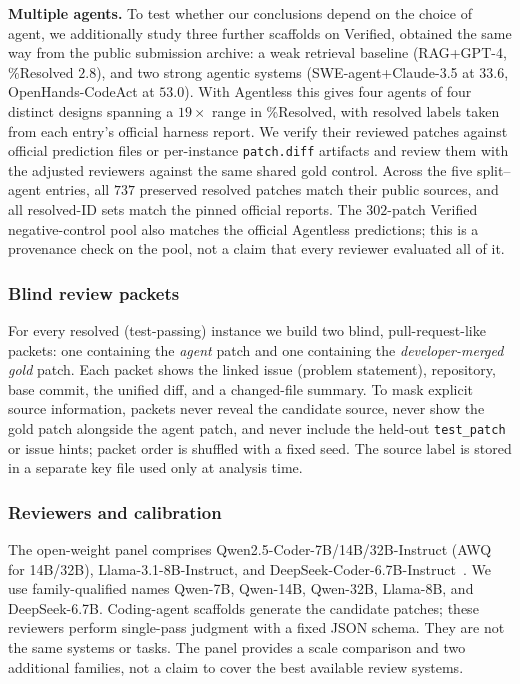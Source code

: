 \documentclass[10pt,conference]{IEEEtran}
\begin{document}
\textbf{Multiple agents.} To test whether our conclusions depend on the choice of agent, we
additionally study three further scaffolds on Verified, obtained the same way from the public
submission archive: a weak retrieval baseline (RAG+GPT-4, \%Resolved $2.8$), and two strong
agentic systems (SWE-agent+Claude-3.5 at $33.6$, OpenHands-CodeAct at $53.0$). With Agentless
this gives four agents of four distinct designs spanning a $19\times$ range in \%Resolved, with
resolved labels taken from each entry's official harness report. We verify their reviewed
patches against official prediction files or per-instance \texttt{patch.diff} artifacts and
review them with the adjusted reviewers against the same shared gold control. Across the
five split--agent entries, all $737$ preserved resolved patches match their public sources,
and all resolved-ID sets match the pinned official reports. The $302$-patch Verified
negative-control pool also matches the official Agentless predictions; this is a provenance
check on the pool, not a claim that every reviewer evaluated all of it.

\subsubsection{Blind review packets}
For every resolved (test-passing) instance we build two blind, pull-request-like packets: one
containing the \emph{agent} patch and one containing the \emph{developer-merged gold} patch.
Each packet shows the linked issue (problem statement), repository, base commit, the unified
diff, and a changed-file summary. To mask explicit source information, packets never reveal the
candidate source, never show the gold patch alongside the agent patch, and never include the
held-out \texttt{test\_patch} or issue hints; packet order is shuffled with a fixed seed. The
source label is stored in a separate key file used only at analysis time.

\subsubsection{Reviewers and calibration}

The open-weight panel comprises Qwen2.5-Coder-7B/14B/32B-Instruct (AWQ for 14B/32B),
Llama-3.1-8B-Instruct, and DeepSeek-Coder-6.7B-Instruct~\cite{qwen25coder}. We use
family-qualified names Qwen-7B, Qwen-14B, Qwen-32B, Llama-8B, and DeepSeek-6.7B.
Coding-agent scaffolds generate the candidate patches; these reviewers perform single-pass
judgment with a fixed JSON schema. They are not the same systems or tasks. The panel
provides a scale comparison and two additional families, not a claim to cover the best
available review systems.
\end{document}
